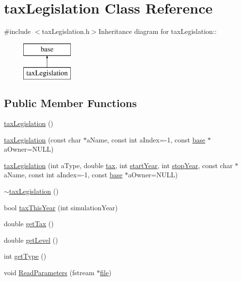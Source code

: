 \hypertarget{classtax_legislation}{
\section{taxLegislation Class Reference}
\label{classtax_legislation}
}


{\ttfamily \#include $<$taxLegislation.h$>$}Inheritance diagram for taxLegislation::\begin{figure}[H]
\begin{center}
\leavevmode
\includegraphics[height=2cm]{classtax_legislation}
\end{center}
\end{figure}
\subsection*{Public Member Functions}
\begin{DoxyCompactItemize}
\item 
\hyperlink{classtax_legislation_a09b089449e25316b4b5df7984fc5a98e}{taxLegislation} ()
\item 
\hyperlink{classtax_legislation_a19c5e1bdde3d7eed93124fab88b4f8da}{taxLegislation} (const char $\ast$aName, const int aIndex=-\/1, const \hyperlink{classbase}{base} $\ast$aOwner=NULL)
\item 
\hyperlink{classtax_legislation_a6308fd276172e291d3510cc8435ab27e}{taxLegislation} (int aType, double \hyperlink{classtax_legislation_adb4fa60260aacf3c1a45a70bd3ae04bc}{tax}, int \hyperlink{classtax_legislation_adbbadff2de7874d7791a8b49184efa20}{startYear}, int \hyperlink{classtax_legislation_af30a4ad86468d2d3e2e5916f8fec7c70}{stopYear}, const char $\ast$aName, const int aIndex=-\/1, const \hyperlink{classbase}{base} $\ast$aOwner=NULL)
\item 
\hyperlink{classtax_legislation_aea929ad962a5f32bb4d67fdbd72eddba}{$\sim$taxLegislation} ()
\item 
bool \hyperlink{classtax_legislation_ae011ae3ec63f87d1b67fcb5a51821f81}{taxThisYear} (int simulationYear)
\item 
double \hyperlink{classtax_legislation_a4996538fc577797ff1774d716fcb65d9}{getTax} ()
\item 
double \hyperlink{classtax_legislation_ae5d6de8995fc279d67c8a99ab669f839}{getLevel} ()
\item 
int \hyperlink{classtax_legislation_ad4433eef048eef886850174f7d799ae5}{getType} ()
\item 
void \hyperlink{classtax_legislation_a36da77119116d76049ca5055659720d7}{ReadParameters} (fstream $\ast$\hyperlink{classbase_a3af52ee9891719d09b8b19b42450b6f6}{file})
\end{DoxyCompactItemize}
